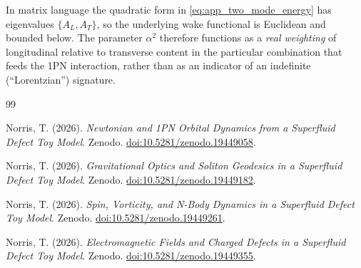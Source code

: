 \documentclass[12pt]{article}
\begin{document}
In matrix language the quadratic form in \eqref{eq:app_two_mode_energy} has
eigenvalues $\{A_L,A_T\}$, so the underlying wake functional is Euclidean and
bounded below.  The parameter $\alpha^2$ therefore functions as a \emph{real
weighting} of longitudinal relative to transverse content in the particular
combination that feeds the 1PN interaction, rather than as an indicator of an
indefinite (``Lorentzian'') signature.
\begin{thebibliography}{99}

Norris, T. (2026).
\newblock \emph{Newtonian and 1PN Orbital Dynamics from a Superfluid Defect Toy Model}.
\newblock Zenodo.
\newblock \href{https://doi.org/10.5281/zenodo.19449058}{doi:10.5281/zenodo.19449058}.

Norris, T. (2026).
\newblock \emph{Gravitational Optics and Soliton Geodesics in a Superfluid Defect Toy Model}.
\newblock Zenodo.
\newblock \href{https://doi.org/10.5281/zenodo.19449182}{doi:10.5281/zenodo.19449182}.

Norris, T. (2026).
\newblock \emph{Spin, Vorticity, and N-Body Dynamics in a Superfluid Defect Toy Model}.
\newblock Zenodo.
\newblock \href{https://doi.org/10.5281/zenodo.19449261}{doi:10.5281/zenodo.19449261}.

Norris, T. (2026).
\newblock \emph{Electromagnetic Fields and Charged Defects in a Superfluid Defect Toy Model}.
\newblock Zenodo.
\newblock \href{https://doi.org/10.5281/zenodo.19449355}{doi:10.5281/zenodo.19449355}.

\end{thebibliography}
\end{document}
